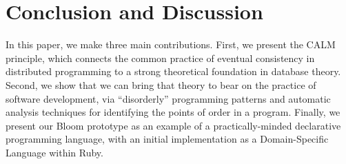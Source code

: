 \section{Conclusion and Discussion}
\label{sec:conclusion}
In this paper, we make three main contributions.  First, we present the CALM
principle, which connects the common practice of eventual consistency in
distributed programming to a strong theoretical foundation in database theory.
Second, we show that we can bring that theory to bear on the practice of
software development, via ``disorderly'' programming patterns and automatic
analysis techniques for identifying the points of order in a program. Finally,
we present our Bloom prototype as an example of a practically-minded declarative
programming language, with an initial implementation as a Domain-Specific
Language within Ruby.

